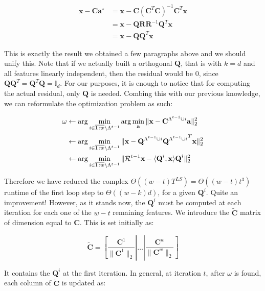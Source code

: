 \documentclass[12pt,a4paper,oneside,english]{UPBThesis}
\newcommand{\hcrange}[2]{\overline{{#1}\colon\!\!{#2}}}
\begin{document}
\begin{align*}
\textbf{x} - \textbf{C}\textbf{a}^\star & = \textbf{x} - \textbf{C}(\textbf{C}^T\textbf{C})^{-1}\textbf{C}^T\textbf{x} \\
& = \textbf{x} - \textbf{Q}\textbf{R}\textbf{R}^{-1}\textbf{Q}^T\textbf{x} \\
& = \textbf{x} - \textbf{Q}\textbf{Q}^T\textbf{x}
\end{align*}

This is exactly the result we obtained a few paragraphs above and we should unify this. Note that if we actually built a orthogonal $\textbf{Q}$, that is with $k = d$ and all features linearly independent, then the residual would be $0$, since $\textbf{Q}\textbf{Q}^T = \textbf{Q}^T\textbf{Q} = \mathbb{I}_d$. For our purposes, it is enough to notice that for computing the actual residual, only $\textbf{Q}$ is needed. Combing this with our previous knowledge, we can reformulate the optimization problem as such:

\begin{align*}
\omega & \gets \arg\min_{i \in \hcrange{1}{w} \setminus \Lambda^{t-1}} \arg\min_\textbf{a} \| \textbf{x} - \textbf{C}^{\Lambda^{t-1} \cup i}\textbf{a} \|_2^2 \\
& \gets \arg\min_{i \in \hcrange{1}{w} \setminus \Lambda^{t-1}} \| \textbf{x} - \textbf{Q}^{\Lambda^{t-1} \cup i}{\textbf{Q}^{\Lambda^{t-1} \cup i}}^T\textbf{x} \|_2^2 \\
& \gets \arg\min_{i \in \hcrange{1}{w} \setminus \Lambda^{t-1}} \| \mathcal{R}^{t-1}\textbf{x} - \langle \textbf{Q}^i, \textbf x \rangle \textbf{Q}^i \|_2^2
\end{align*}

Therefore we have reduced the complex $\Theta((w - t)T^{LS}) = \Theta((w - t)t^3)$ runtime of the first loop step to $\Theta((w - k)d)$, for a given $\textbf{Q}^i$. Quite an improvement! However, as it stands now, the $\textbf{Q}^i$ must be computed at each iteration for each one of the $w - t$ remaining features. We introduce the $\tilde{\textbf{C}}$ matrix of dimension equal to $\textbf{C}$. This is set initially as:

\begin{equation*}
\tilde{\textbf{C}} = \left[ \frac{\textbf{C}^1}{\|\textbf{C}^1\|_2} \left|\right. \dots \left|\right. \frac{\textbf{C}^w}{\|\textbf{C}^w\|_2} \right]
\end{equation*}

It contains the $\textbf{Q}^i$ at the first iteration. In general, at iteration $t$, after $\omega$ is found, each column of $\tilde{\textbf{C}}$ is updated as:
\end{document}
